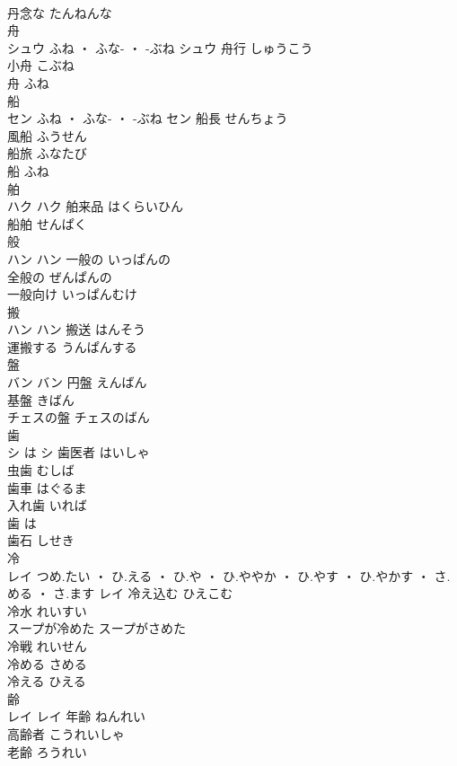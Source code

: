 \documentclass[8pt]{extreport}
\begin{document}
\begin{CJK}{UTF8}{min}
\\	丹念な	たんねんな	
\\	舟	
\\	シュウ	ふね ・ ふな- ・ -ぶね	シュウ	舟行	しゅうこう	
\\	小舟	こぶね	
\\	舟	ふね	
\\	船	
\\	セン	ふね ・ ふな- ・ -ぶね	セン	船長	せんちょう	
\\	風船	ふうせん	
\\	船旅	ふなたび	
\\	船	ふね	
\\	舶	
\\	ハク		ハク	舶来品	はくらいひん	
\\	船舶	せんぱく	
\\	般	
\\	ハン		ハン	一般の	いっぱんの	
\\	全般の	ぜんぱんの	
\\	一般向け	いっぱんむけ	
\\	搬	
\\	ハン		ハン	搬送	はんそう	
\\	運搬する	うんぱんする	
\\	盤	
\\	バン		バン	円盤	えんばん	
\\	基盤	きばん	
\\	チェスの盤	チェスのばん	
\\	歯	
\\	シ	は	シ	歯医者	はいしゃ	
\\	虫歯	むしば	
\\	歯車	はぐるま	
\\	入れ歯	いれば	
\\	歯	は	
\\	歯石	しせき	
\\	冷	
\\	レイ	つめ.たい ・ ひ.える ・ ひ.や ・ ひ.ややか ・ ひ.やす ・ ひ.やかす ・ さ.める ・ さ.ます	レイ	冷え込む	ひえこむ	
\\	冷水	れいすい	
\\	スープが冷めた	スープがさめた	
\\	冷戦	れいせん	
\\	冷める	さめる	
\\	冷える	ひえる	
\\	齢	
\\	レイ		レイ	年齢	ねんれい	
\\	高齢者	こうれいしゃ	
\\	老齢	ろうれい	

\end{CJK}
\end{document}
